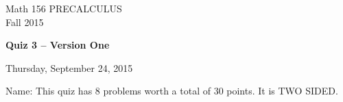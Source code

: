 \documentclass[11pt]{article}
\begin{document}
\begin{center}
\vspace{2in}

\huge{Math 156 PRECALCULUS \\
Fall 2015}

\vfill

\huge{\bf{Quiz 3 -- Version One}}\\

\vspace{0.5in}

\large{Thursday, September 24, 2015}\\

\vfill


{\huge{Name:{\underline{\hspace{2in}}}}}
\vfill
This quiz has 8 problems worth a total of 30 points. It is TWO SIDED. 
\vfill
\end{center}
\newpage
\restoregeometry
\end{document}
